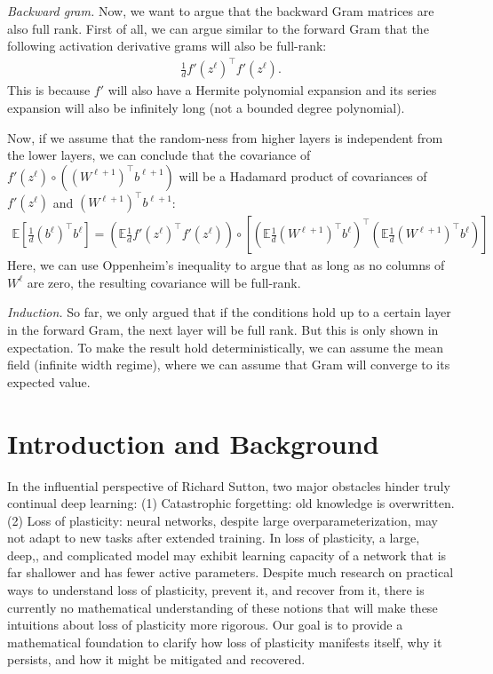 \documentclass[11pt]{article}
\newcommand{\E}{\mathbb{E}}
\begin{document}
\textit{Backward gram.} Now, we want to argue that the backward Gram matrices are also full rank. First of all, we can argue similar to the forward Gram that the following activation derivative grams will also be full-rank:
\begin{align*}
    \frac1d f'(z^\ell)^\top f'(z^\ell). 
\end{align*}
This is because $f'$ will also have a Hermite polynomial expansion and its series expansion will also be infinitely long (not a bounded degree polynomial). 

Now, if we assume that the random-ness from higher layers is independent from the lower layers, we can conclude that the covariance of $f'(z^\ell)\circ ((W^{\ell+1})^\top b^{\ell+1})$ will be a Hadamard product of covariances of $f'(z^\ell)$ and $(W^{\ell+1})^\top b^{\ell+1}$: 
\begin{align*}
    \E [\frac1d (b^{\ell})^\top b^\ell] = (\E \frac1d f'(z^\ell)^\top f'(z^\ell)) \circ [(\E\frac1d (W^{\ell+1})^\top b^\ell)^\top (\E\frac1d (W^{\ell+1})^\top b^\ell)]
\end{align*}
Here, we can use Oppenheim's inequality to argue that as long as no columns of $W^\ell$ are zero, the resulting covariance will be full-rank. 

\textit{Induction.} So far, we only argued that if the conditions hold up to a certain layer in the forward Gram, the next layer will be full rank. But this is only shown in expectation. To make the result hold deterministically, we can assume the mean field (infinite width regime), where we can assume that  Gram will converge to its expected value. 




\section{Introduction and Background}



In the influential perspective of Richard Sutton, two major obstacles hinder truly continual deep learning:
(1) Catastrophic forgetting: old knowledge is overwritten.
(2) Loss of plasticity: neural networks, despite large overparameterization, may not adapt to new tasks after extended training. In loss of plasticity, a large, deep,, and complicated model may exhibit learning capacity of a network that is far shallower and has fewer active parameters. Despite much research on practical ways to understand loss of plasticity, prevent it, and recover from it, there is currently no mathematical understanding of these notions that will make these intuitions about loss of plasticity more rigorous. Our goal is to provide a mathematical foundation to clarify how loss of plasticity manifests itself, why it persists, and how it might be mitigated and recovered.
\end{document}
